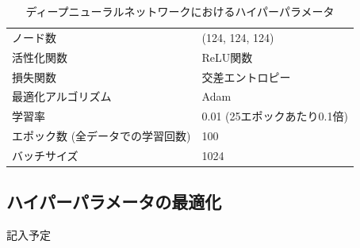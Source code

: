 \begin{table}[H]
 \centering
  \begin{tabular}{ l  l }
   \hline
   ノード数 & (124, 124, 124)\\
   活性化関数 & ReLU関数\\
   損失関数 & 交差エントロピー\\
   最適化アルゴリズム & Adam\\
   学習率 & 0.01 (25エポックあたり0.1倍)\\
   エポック数 (全データでの学習回数) & 100\\
   バッチサイズ & 1024\\
   \hline
  \end{tabular}
  \caption{ディープニューラルネットワークにおけるハイパーパラメータ}
  \label{dnnsetting}
\end{table}
\subsection{ハイパーパラメータの最適化}
記入予定
